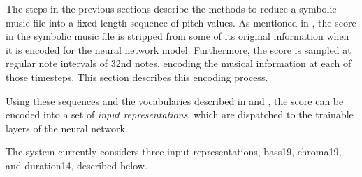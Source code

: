 
The steps in the previous sections describe the methods to
reduce a symbolic music file into a fixed-length sequence of
pitch values. As mentioned in
, the score in the symbolic
music file is stripped from some of its original information
when it is encoded for the neural network model.
Furthermore, the score is sampled at regular note intervals
of \gls{32nd} notes, encoding the musical information at
each of those timesteps. This section describes this
encoding process.

Using these sequences and the vocabularies described in
 and
, the
score can be encoded into a set of \emph{input
representations}, which are dispatched to the trainable
layers of the neural network.

The system currently considers three input representations,
\gls{bass19}, \gls{chroma19}, and \gls{duration14},
described below.


